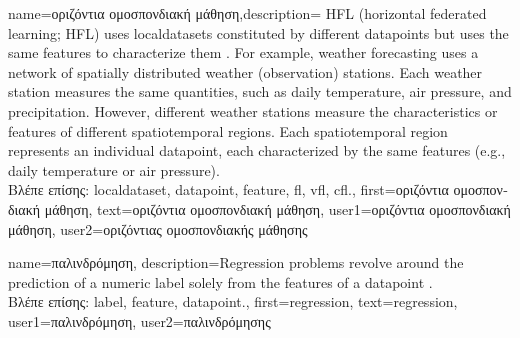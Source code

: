 {name={\foreignlanguage{greek}{οριζόντια ομοσπονδιακή μάθηση}},description=
	{HFL (horizontal federated learning; HFL) uses \gls{localdataset}s constituted by different
	   \gls{datapoint}s but uses the same \gls{feature}s to characterize them \cite{HFLChapter2020}.
		For example, weather forecasting uses a network of spatially distributed
		weather (observation) stations. Each weather station measures the
		same quantities, such as daily temperature, air pressure, and precipitation.
		However, different weather stations measure the characteristics or
		\gls{feature}s of different spatiotemporal regions. Each spatiotemporal region 
		represents an individual \gls{datapoint}, each characterized by the same \gls{feature}s 
		(e.g., daily temperature or air pressure).\\
		\foreignlanguage{greek}{Βλέπε επίσης:} \gls{localdataset}, \gls{datapoint}, \gls{feature}, \gls{fl}, \gls{vfl}, \gls{cfl}.},
	first={\foreignlanguage{greek}{οριζόντια ομοσπονδιακή μάθηση}},
	text={\foreignlanguage{greek}{οριζόντια ομοσπονδιακή μάθηση}},
	user1={\foreignlanguage{greek}{οριζόντια ομοσπονδιακή μάθηση}}, %
	user2={\foreignlanguage{greek}{οριζόντιας ομοσπονδιακής μάθησης}} %
} 


{name={\foreignlanguage{greek}{παλινδρόμηση}},
	description={Regression problems revolve around the 
		prediction of a numeric \gls{label} solely from the \gls{feature}s of a \gls{datapoint} \cite[Ch. 2]{MLBasics}.\\
		\foreignlanguage{greek}{Βλέπε επίσης:} \gls{label}, \gls{feature}, \gls{datapoint}.},
	first={regression},
	text={regression},
	user1={\foreignlanguage{greek}{παλινδρόμηση}}, %
  	user2={\foreignlanguage{greek}{παλινδρόμησης}} %
}

